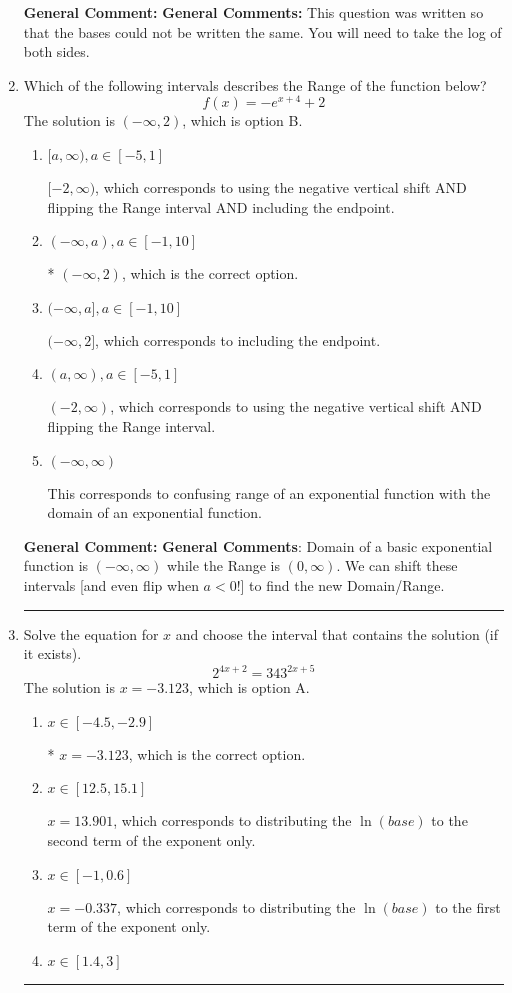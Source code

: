 \documentclass{extbook}[14pt]
\newcommand{\litem}[1]{\item #1

\rule{\textwidth}{0.4pt}}
\begin{document}
\begin{enumerate}
{\textbf{General Comment:} \textbf{General Comments:} This question was written so that the bases could not be written the same. You will need to take the log of both sides.
}
\litem{
Which of the following intervals describes the Range of the function below?
\[ f(x) = -e^{x+4}+2 \]The solution is \( (-\infty, 2) \), which is option B.\begin{enumerate}[label=\Alph*.]
\item \( [a, \infty), a \in [-5, 1] \)

$[-2, \infty)$, which corresponds to using the negative vertical shift AND flipping the Range interval AND including the endpoint.
\item \( (-\infty, a), a \in [-1, 10] \)

* $(-\infty, 2)$, which is the correct option.
\item \( (-\infty, a], a \in [-1, 10] \)

$(-\infty, 2]$, which corresponds to including the endpoint.
\item \( (a, \infty), a \in [-5, 1] \)

$(-2, \infty)$, which corresponds to using the negative vertical shift AND flipping the Range interval.
\item \( (-\infty, \infty) \)

This corresponds to confusing range of an exponential function with the domain of an exponential function.
\end{enumerate}

\textbf{General Comment:} \textbf{General Comments}: Domain of a basic exponential function is $(-\infty, \infty)$ while the Range is $(0, \infty)$. We can shift these intervals [and even flip when $a<0$!] to find the new Domain/Range.
}
\litem{
Solve the equation for $x$ and choose the interval that contains the solution (if it exists).
\[ 2^{4x+2} = 343^{2x+5} \]The solution is \( x = -3.123 \), which is option A.\begin{enumerate}[label=\Alph*.]
\item \( x \in [-4.5, -2.9] \)

* $x = -3.123$, which is the correct option.
\item \( x \in [12.5, 15.1] \)

$x = 13.901$, which corresponds to distributing the $\ln(base)$ to the second term of the exponent only.
\item \( x \in [-1, 0.6] \)

$x = -0.337$, which corresponds to distributing the $\ln(base)$ to the first term of the exponent only.
\item \( x \in [1.4, 3] \)


\end{enumerate}}
\end{enumerate}
\end{document}
